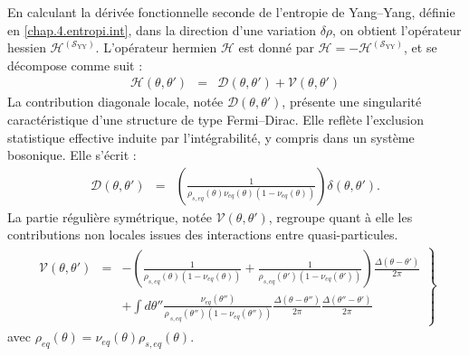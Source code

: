 En calculant la dérivée fonctionnelle seconde de l'entropie de Yang–Yang, définie en \eqref{chap.4.entropi.int}, dans la direction d'une variation $\delta \rho$, on obtient l'opérateur hessien $\mathcal{H}^{(\mathcal{S}_{\mathrm{YY}})}$.  
L'opérateur hermien $\mathcal{H}$ est donné par $\mathcal{H} = -\mathcal{H}^{(\mathcal{S}_{\mathrm{YY}})}$, et se décompose comme suit :
\begin{eqnarray}
	\mathcal{H}(\theta, \theta') & = & \mathcal{D}(\theta, \theta') + \mathcal{V}(\theta, \theta')
	\label{chap:fluctu:eq:hessienne3} 	
\end{eqnarray}
La contribution diagonale locale, notée $\mathcal{D}(\theta, \theta')$, présente une singularité caractéristique d’une structure de type Fermi–Dirac. Elle reflète l’exclusion statistique effective induite par l’intégrabilité, y compris dans un système bosonique. Elle s’écrit :
\begin{eqnarray}\label{chap:fluctu:eq:irreg_0}
	\mathcal{D}(\theta, \theta') & = & \left ( \frac{1}{\rho_{\! s , eq}(\theta) \nu_{\! eq}(\theta) (1 - \nu_{\! eq}(\theta)) }\right )  \delta(\theta, \theta'). 	
\end{eqnarray}
La partie régulière symétrique, notée $\mathcal{V}(\theta, \theta')$, regroupe quant à elle les contributions non locales issues des interactions entre quasi-particules.
\begin{eqnarray}
	\left . \begin{array}{rcl}\mathcal{V}(\theta, \theta')	 & = &  \displaystyle - \left ( \frac{1}{\rho_{\! s , eq}(\theta) (1 - \nu_{\! eq}(\theta) ) } + \frac{1}{\rho_{\! s, eq}(\theta')   (1 - \nu_{\! eq}(\theta')) }\right )\frac{\Delta(\theta - \theta')}{2\pi}\\
	&&  \displaystyle  + \int d \theta''  \frac{\nu_{\! eq}(\theta'')}{\rho_{\, s, eq}(\theta'')(1 - \nu_{\! eq}(\theta'')) } \frac{\Delta(\theta - \theta'' )}{2\pi} \frac{\Delta(\theta''  - \theta')}{2\pi}
	\end{array}\right \} 
	\label{chap:fluctu:eq:reg}
\end{eqnarray}
avec $\rho_{\! eq}(\theta) = \nu_{\! eq}(\theta)\rho_{\! s, eq}(\theta)$.



